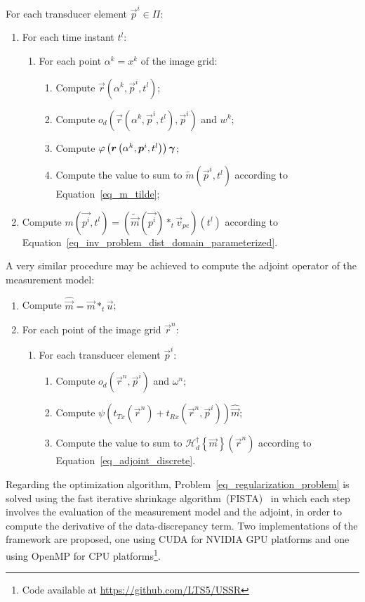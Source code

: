 \documentclass[conference]{IEEEtran}
\begin{document}
For each transducer element $\vec{p}^i \in \Pi$:
\begin{enumerate}
	\item For each time instant $t^l$:
	\begin{enumerate}
		\item For each point $\alpha^k = x^k$ of the image grid:
		\begin{enumerate}
			\item Compute $\vec{r}\left(\alpha^k, \vec{p}^i, t^l\right)$;
			\item Compute $o_d\left(\vec{r}\left(\alpha^k, \vec{p}^i, t^l\right), \vec{p}^i\right)$ and $w^k$;
			\item Compute $\varphi \left(\bm{r}\left(\alpha^k, \bm{p}^i, t^l\right)\right) \bm{\gamma}$;
			\item Compute the value to sum to $\tilde{m}\left(\vec{p}^i, t^l\right)$ according to Equation~\eqref{eq_m_tilde};
		\end{enumerate} 
	\end{enumerate}
	\item Compute $m \left(\vec{p^i}, t^l\right) = \left(\tilde{\vec{m}} \left(\vec{p^i}\right) \ast_t \vec{v}_{pe}\right) \left(t^l\right)$ according to Equation~\eqref{eq_inv_problem_dist_domain_parameterized}.
\end{enumerate}

A very similar procedure may be achieved to compute the adjoint operator of the measurement model:
\begin{enumerate}
	\item Compute $\hat{\vec{m}} = \vec{m} \ast_t \vec{u}$;
	\item For each point of the image grid $\vec{r}^n$:
	\begin{enumerate}
		\item For each transducer element $\vec{p}^i$:
		\begin{enumerate}
			\item Compute $o_d\left(\vec{r}^n, \vec{p}^i\right)$ and $\omega^n$;
			\item Compute $\psi \left(t_{Tx}\left(\vec{r}^n\right) + t_{Rx} \left( \vec{r}^n, \vec{p}^i \right) \right) \hat{\vec{m}}$;
			\item Compute the value to sum to $\mathcal{H}_d^\dagger \left\lbrace\vec{m}\right\rbrace \left(\vec{r}^n\right)$ according to Equation~\eqref{eq_adjoint_discrete}.
		\end{enumerate}
	\end{enumerate}
\end{enumerate}
Regarding the optimization algorithm, Problem~\eqref{eq_regularization_problem} is solved using the fast iterative shrinkage algorithm~(FISTA)~\cite{Beck_SIAM_2009} in which each step involves the evaluation of the measurement model and the adjoint, in order to compute the derivative of the data-discrepancy term. Two implementations of the framework are proposed, one using CUDA for NVIDIA GPU platforms and one using OpenMP for CPU platforms\footnote{Code available at \url{https://github.com/LTS5/USSR}}.
\end{document}
